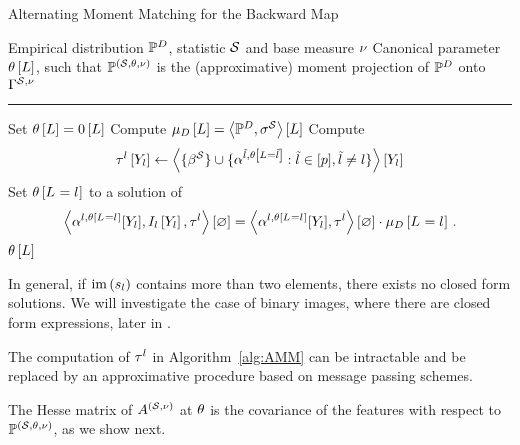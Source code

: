 \begin{algorithm}[h!]
    \caption{Alternating Moment Matching for the Backward Map}\label{alg:AMM}
    \begin{algorithmic}
        \Require Empirical distribution $\mathbb{P}^{D}$, statistic $\mathcal{S}$ and base measure $\nu$
        \Ensure Canonical parameter $\theta\left[L\right]$, such that $\mathbb{P}^{(\mathcal{S},\theta,\nu)}$ is the (approximative) moment projection of $\mathbb{P}^{D}$ onto $\Gamma^{\mathcal{S},\nu}$
        \hrule
        \State Set $\theta\left[L\right]=0\left[L\right]$
        \State Compute $\mu_{D}\left[L\right]= \left\langle \mathbb{P}^{D},\sigma^{\mathcal{S}}\right\rangle \left[ L \right]$
            \For{$\selindexin$}
                \State Compute
                \begin{align*}
                    \tau^{l}\left[Y_{l}\right]
                    \leftarrow \left\langle \{\beta^{\mathcal{S}}\}\cup\{\alpha^{\tilde{l},\theta\left[L=\tilde{l}\right]} : \tilde{l} \in [p], \tilde{l}\neq l\}\right\rangle \left[ Y_{l} \right]
                \end{align*}
                \State Set $\theta\left[L_{}=l_{}\right]$ to a solution of
                \begin{align*}
                    \left\langle \alpha^{l,\theta\left[L_{}=l_{}\right]}[Y_{l}],I_{l}\left[Y_{l}\right],\tau^{l}\right\rangle \left[ \varnothing \right]
                    = \left\langle \alpha^{l,\theta\left[L_{}=l_{}\right]}[Y_{l}],\tau^{l}\right\rangle \left[ \varnothing \right] \cdot \mu_{D}\left[L_{}=l_{}\right] \, .
                \end{align*}
            \EndFor
        \EndWhile
        \State \Return $\theta\left[L\right]$
    \end{algorithmic}
\end{algorithm}


% 
In general, if $\mathrm{im}\left(s_{l}\right)$ contains more than two elements, there exists no closed form solutions.
We will investigate the case of binary images, where there are closed form expressions, later in .

%
The computation of $\tau^{l}$ in Algorithm~\ref{alg:AMM} can be intractable and be replaced by an approximative procedure based on message passing schemes.


The Hesse matrix of $A^{(\mathcal{S},\nu)}$ at $\theta$ is the covariance of the features with respect to $\mathbb{P}^{(\mathcal{S},\theta,\nu)}$, as we show next.

